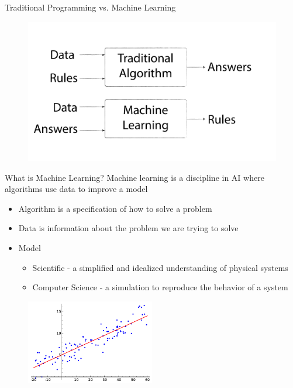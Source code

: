 \documentclass[10pt]{beamer}
\begin{document}
\begin{frame}{Traditional Programming vs. Machine Learning}
	\begin{figure}
		\includegraphics[width=1.0\textwidth, center, trim=0cm 0cm 0 0cm]{images/ML_paradigm.pdf}
	\end{figure}
\end{frame}

\begin{frame}{What is Machine Learning?}
Machine learning is a discipline in AI where algorithms use data to improve a model
	\begin{itemize}
		\item Algorithm is a specification of how to solve a problem
		\item Data is information about the problem we are trying to solve
		\item Model
		\begin{itemize}
			\item Scientific - a simplified and idealized understanding of physical systems
			\item Computer Science - a simulation to reproduce the behavior of a system
		\end{itemize}
	\end{itemize}
	\begin{figure}
		\includegraphics[width=0.5\textwidth, center, trim=0cm 0cm 0 0cm]{images/Linear_regression.pdf}
	\end{figure}
\end{frame}
\end{document}
